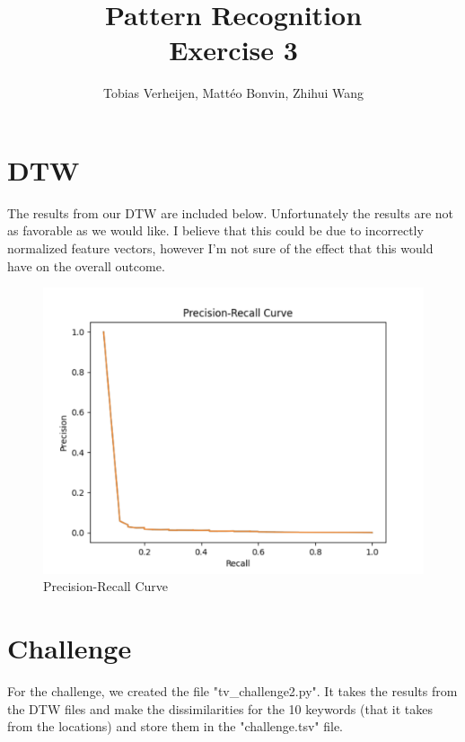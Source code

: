 \documentclass{article}
\title{Pattern Recognition \\\Large{Exercise 3}}
\author{Tobias Verheijen, Mattéo Bonvin, Zhihui Wang}
\date{}
\begin{document}
\maketitle

\section{DTW}

The results from our DTW are included below. Unfortunately the results are not as favorable as we would like. I believe that this could be due to incorrectly normalized feature vectors, however I'm not sure of the effect that this would have on the overall outcome.

\begin{figure}
    \centering
    \includegraphics[width=\linewidth]{Precision-Recall.png}
    \caption{Precision-Recall Curve}
    \label{fig:enter-label}
\end{figure}

\section{Challenge}

For the challenge, we created the file "tv\_challenge2.py". It takes the results from the DTW files and make the dissimilarities for the 10 keywords (that it takes from the locations) and store them in the "challenge.tsv" file.
\end{document}
